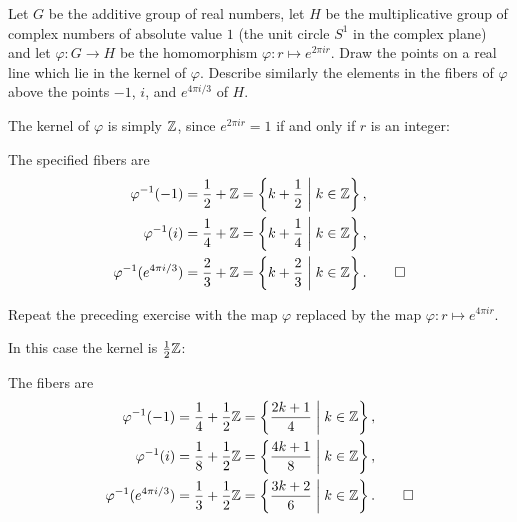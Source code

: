 \label{exercise:quotient-group:r-to-s1-kernel}
Let $G$ be the additive group of real numbers, let $H$
be the multiplicative group of complex numbers of absolute value $1$
(the unit circle $S^1$ in the complex plane) and let
$\varphi\colon G\to H$ be the homomorphism
$\varphi\colon r\mapsto e^{2\pi ir}$. Draw the points on a real line
which lie in the kernel of $\varphi$. Describe similarly the elements
in the fibers of $\varphi$ above the points $-1$, $i$, and
$e^{4\pi i/3}$ of $H$.
\begin{solution}
  The kernel of $\varphi$ is simply $\mathbb{Z}$, since $e^{2\pi ir} = 1$ if
  and only if $r$ is an integer:
  \begin{center}
  \end{center}

  The specified fibers are
  \begin{align*}
    \varphi^{-1}(-1)
    &= \frac12 + \mathbb{Z} = \left\{k + \frac12 \;\middle|\; k\in\mathbb{Z}\right\}, \\
    \varphi^{-1}(i)
    &= \frac14 + \mathbb{Z} = \left\{k + \frac14 \;\middle|\; k\in\mathbb{Z}\right\}, \\
    \varphi^{-1}(e^{4\pi i/3})
    &= \frac23 + \mathbb{Z} = \left\{k + \frac23 \;\middle|\; k\in\mathbb{Z}\right\}.
      \qedhere
  \end{align*}
\end{solution}

 Repeat the preceding exercise with the map $\varphi$
replaced by the map $\varphi\colon r\mapsto e^{4\pi ir}$.
\begin{solution}
  In this case the kernel is $\frac12\mathbb{Z}$:
  \begin{center}
  \end{center}

  The fibers are
  \begin{align*}
    \varphi^{-1}(-1)
    &= \frac14 + \frac12\mathbb{Z}
      = \left\{\frac{2k+1}4 \;\middle|\; k\in\mathbb{Z}\right\}, \\
    \varphi^{-1}(i)
    &= \frac18 + \frac12\mathbb{Z}
      = \left\{\frac{4k+1}8 \;\middle|\; k\in\mathbb{Z}\right\}, \\
    \varphi^{-1}(e^{4\pi i/3})
    &= \frac13 + \frac12\mathbb{Z}
      = \left\{\frac{3k+2}6 \;\middle|\; k\in\mathbb{Z}\right\}.
      \qedhere
  \end{align*}
\end{solution}

